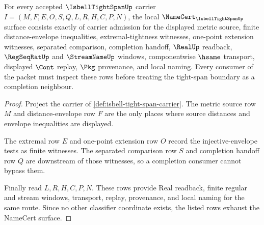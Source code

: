 \begin{theorem}
\label{thm:isbell-tight-span-namecert-obligations}
For every accepted $\IsbellTightSpanUp$ carrier $I=(M,F,E,O,S,Q,L,R,H,C,P,N)$, the local $\NameCert_{\IsbellTightSpanUp}$ surface consists exactly of carrier admission for the displayed metric source, finite distance-envelope inequalities, extremal-tightness witnesses, one-point extension witnesses, separated comparison, completion handoff, $\RealUp$ readback, $\RegSeqRatUp$ and $\StreamNameUp$ windows, componentwise $\hsame$ transport, displayed $\Cont$ replay, $\Pkg$ provenance, and local naming. Every consumer of the packet must inspect these rows before treating the tight-span boundary as a completion neighbour.
\end{theorem}
\begin{proof}
Project the carrier of \autoref{def:isbell-tight-span-carrier}. The metric source row $M$ and distance-envelope row $F$ are the only places where source distances and envelope inequalities are displayed.

The extremal row $E$ and one-point extension row $O$ record the injective-envelope tests as finite witnesses. The separated comparison row $S$ and completion handoff row $Q$ are downstream of those witnesses, so a completion consumer cannot bypass them.

Finally read $L,R,H,C,P,N$. These rows provide Real readback, finite regular and stream windows, transport, replay, provenance, and local naming for the same route. Since no other classifier coordinate exists, the listed rows exhaust the NameCert surface.
\end{proof}

